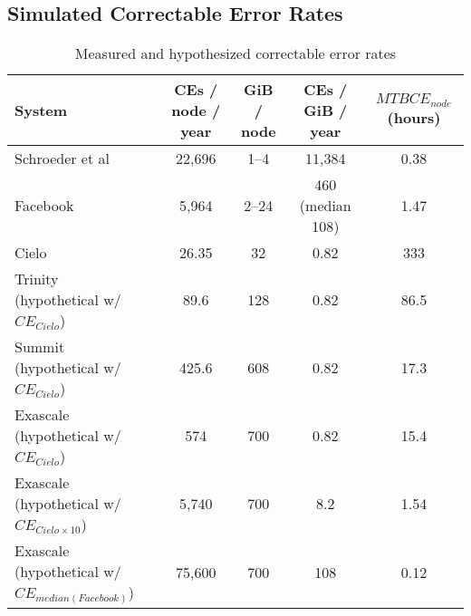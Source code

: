\subsection{Simulated Correctable Error Rates}



\begin{table*} 
        \centering 
        \begin{tabular}{ l c c c c } 
         \toprule
                System & CEs / node / year & GiB / node & CEs / GiB / year & $MTBCE_{node}$ (hours)\\
         \midrule
                Schroeder et al~\cite{Schroeder:09:dram}  & 22,696 & 1--4 & 11,384 & 0.38\\
                Facebook~\cite{meza:2015:revisiting} & 5,964 & 2--24 & 460
                (median 108)& 1.47\\ %
                Cielo~\cite{levy:2018:lessons} & 26.35 & 32 & 0.82 & 333 \\ %
                Trinity~\cite{Trinity} (hypothetical w/ $CE_{Cielo}$)  &  89.6 &
                128 & 0.82 & 86.5\\   %
                Summit~\cite{Summit} (hypothetical w/ $CE_{Cielo}$)  &  425.6 &
                608 & 0.82 & 17.3\\   %
                Exascale (hypothetical w/ $CE_{Cielo}$) & 574 & 700 & 0.82 &
                15.4 \\%
                Exascale (hypothetical w/ $CE_{Cielo \times 10}$) & 5,740 & 700 &
                8.2 & 1.54 \\%
                Exascale (hypothetical w/ $CE_{median( Facebook )}$) & 75,600 & 700 & 108 &
                0.12 \\%
         \bottomrule
        \end{tabular}
        \vspace{.6em}
        \caption{ 
                Measured and hypothesized correctable error rates
        }
        \label{tab:CE_rate}
\end{table*}

